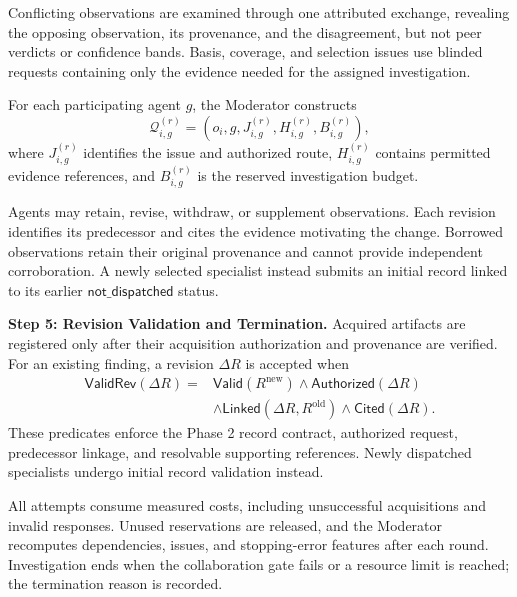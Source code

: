 Conflicting observations are examined
through one attributed exchange,
revealing the opposing observation,
its provenance, and the disagreement,
but not peer verdicts or confidence
bands. Basis, coverage, and selection
issues use blinded requests containing
only the evidence needed for the
assigned investigation.

For each participating agent $g$,
the Moderator constructs
\begin{equation}
\mathcal Q_{i,g}^{(r)}=
(o_i,g,J_{i,g}^{(r)},
H_{i,g}^{(r)},B_{i,g}^{(r)}),
\label{eq:collaboration-request}
\end{equation}
where $J_{i,g}^{(r)}$ identifies
the issue and authorized route,
$H_{i,g}^{(r)}$ contains permitted
evidence references, and
$B_{i,g}^{(r)}$ is the reserved
investigation budget.

Agents may retain, revise, withdraw,
or supplement observations. Each
revision identifies its predecessor
and cites the evidence motivating
the change. Borrowed observations
retain their original provenance
and cannot provide independent
corroboration. A newly selected
specialist instead submits an initial
record linked to its earlier
$\mathsf{not\_dispatched}$ status.

\medskip
\noindent\textbf{Step 5: Revision
Validation and Termination.}
Acquired artifacts are registered
only after their acquisition
authorization and provenance are
verified. For an existing finding,
a revision $\Delta R$ is accepted
when
\begin{equation}
\begin{aligned}
\mathsf{ValidRev}(\Delta R)={}&
\mathsf{Valid}(R^{\mathrm{new}})
\land\mathsf{Authorized}(\Delta R)\\
&\land\mathsf{Linked}
(\Delta R,R^{\mathrm{old}})
\land\mathsf{Cited}(\Delta R).
\end{aligned}
\label{eq:revision-validity}
\end{equation}
These predicates enforce the Phase 2
record contract, authorized request,
predecessor linkage, and resolvable
supporting references. Newly dispatched
specialists undergo initial record
validation instead.

All attempts consume measured costs,
including unsuccessful acquisitions
and invalid responses. Unused
reservations are released, and the
Moderator recomputes dependencies,
issues, and stopping-error features
after each round. Investigation ends
when the collaboration gate fails
or a resource limit is reached;
the termination reason is recorded.






